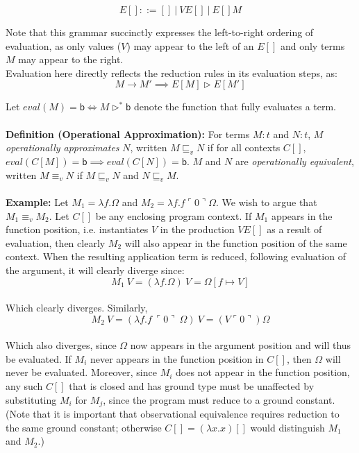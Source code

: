 \documentclass[a4paper,10pt]{article}
\begin{document}
\[
 E[] ::= []\ \vert\ V E[]\ \vert\ E[] M
\]

Note that this grammar succinctly expresses the left-to-right ordering of evaluation, as only values
($V$) may appear to the left of an $E[]$ and only terms $M$ may appear to the right.\\

Evaluation here directly reflects the reduction rules in its evaluation steps, as:\\

\[
 M \rightarrow M\prime \implies E[M] \rhd E[M']
\]

Let $eval(M) = \textsf{b} \iff M \rhd^* \textsf{b}$ denote the function that fully evaluates a term.\\
\\
\textbf{Definition (Operational Approximation):} For terms $M : t$ and $N : t$, $M$
\emph{operationally approximates} $N$, written $M \sqsubseteq_v N$ if for all contexts $C[]$,
$eval(C[M]) = \textsf{b} \implies eval(C[N]) = \textsf{b}$.  $M$ and $N$ are \emph{operationally
equivalent}, written $M \equiv_v N$ if $M \sqsubseteq_v N$ and $N \sqsubseteq_v M$.\\
\\
\textbf{Example:} Let $M_1 = \lambda f . \Omega$ and $M_2 = \lambda f . f \ulcorner 0 \urcorner \Omega$.
We wish to argue that $M_1 \equiv_v M_2$.  Let $C[]$ be any enclosing program context.  If $M_1$
appears in the function position, i.e. instantiates $V$ in the production $V E[]$ as a result of
evaluation, then clearly $M_2$ will also appear in the function position of the same context.
When the resulting application term is reduced, following evaluation of the argument, it will
clearly diverge since:\\
\[ M_1\ V = (\lambda f . \Omega)\ V = \Omega[f \mapsto V]\]\\

Which clearly diverges.  Similarly,\\

\[M_2\ V = (\lambda f . f\ \ulcorner 0 \urcorner\ \Omega)\ V = (V \ulcorner 0 \urcorner) \Omega \]\\

Which also diverges, since $\Omega$ now appears in the argument position and will thus be evaluated.
If $M_i$ never appears in the function position in $C[]$, then $\Omega$ will never be evaluated.
Moreover, since $M_i$ does not appear in the function position, any such $C[]$ that is closed and has
ground type must be unaffected by substituting $M_i$ for $M_j$, since the program must reduce to
a ground constant.  (Note that it is important that observational equivalence requires reduction
to the same ground constant; otherwise $C[] = (\lambda x . x) []$ would distinguish $M_1$ and $M_2$.)
\end{document}
